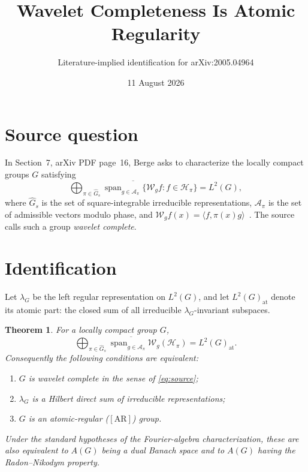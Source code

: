 \documentclass[11pt]{article}
\title{Wavelet Completeness Is Atomic Regularity}
\author{Literature-implied identification for arXiv:2005.04964}
\date{11 August 2026}
\newtheorem{theorem}{Theorem}
\newcommand{\cH}{\mathcal H}
\newcommand{\cW}{\mathcal W}
\newcommand{\widehatGs}{\widehat G_{s}}
\begin{document}
\maketitle

\begin{center}
\end{center}

\section*{Source question}

In Section~7, arXiv PDF page~16, Berge asks to characterize the locally compact
groups $G$ satisfying
\begin{equation}\label{eq:source}
 \overline{\bigoplus_{\pi\in\widehatGs}
 \operatorname{span}_{g\in\mathcal A_\pi}
 \{\cW_gf:f\in\cH_\pi\}}=L^2(G),
\end{equation}
where $\widehatGs$ is the set of square-integrable irreducible representations,
$\mathcal A_\pi$ is the set of admissible vectors modulo phase, and
$\cW_gf(x)=\langle f,\pi(x)g\rangle$~\cite{berge}. The source calls such a group
\emph{wavelet complete}.

\section*{Identification}

Let $\lambda_G$ be the left regular representation on $L^2(G)$, and let
$L^2(G)_{\mathrm{at}}$ denote its atomic part: the closed sum of all irreducible
$\lambda_G$-invariant subspaces.

\begin{theorem}\label{thm:id}
For a locally compact group $G$,
\[
 \overline{\bigoplus_{\pi\in\widehatGs}
 \operatorname{span}_{g\in\mathcal A_\pi}\cW_g(\cH_\pi)}
 =L^2(G)_{\mathrm{at}}.
\]
Consequently the following conditions are equivalent:
\begin{enumerate}
\item $G$ is wavelet complete in the sense of \eqref{eq:source};
\item $\lambda_G$ is a Hilbert direct sum of irreducible representations;
\item $G$ is an atomic-regular ($[\mathrm{AR}]$) group.
\end{enumerate}
Under the standard hypotheses of the Fourier-algebra characterization, these
are also equivalent to $A(G)$ being a dual Banach space and to $A(G)$ having
the Radon--Nikodym property.
\end{theorem}
\end{document}
